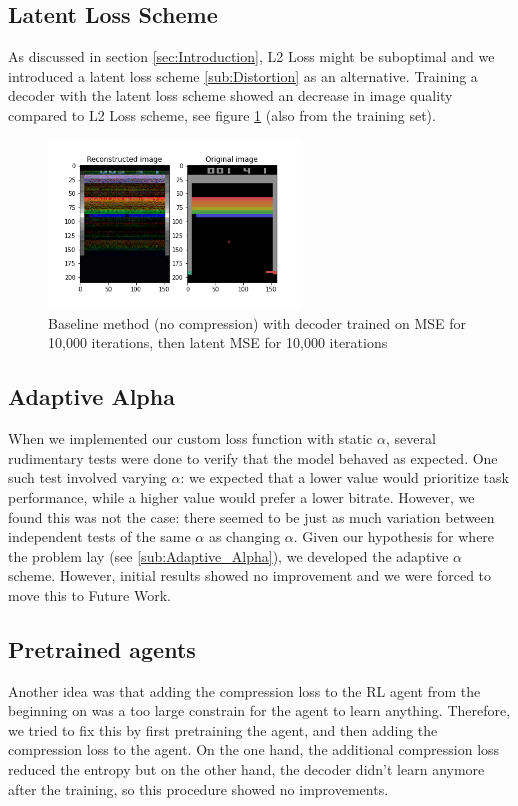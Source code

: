 \subsection{Latent Loss Scheme}
As discussed in section \ref{sec:Introduction}, L2 Loss might be suboptimal and
we introduced a latent loss scheme \ref{sub:Distortion} as an alternative.
Training a decoder with the latent loss scheme showed an decrease in image
quality compared to L2 Loss scheme, see figure \ref{fig:baseline_MSE_latent}
(also from the training set).

\begin{figure}[H]
    \centering
    \includegraphics[width=0.6\textwidth]{images/orig_reconstructed_rl3.0.png}
    \caption{Baseline method (no compression) with decoder trained on MSE for 10,000 iterations, then latent MSE for 10,000 iterations}
    \label{fig:baseline_MSE_latent}
\end{figure}

\subsection{Adaptive Alpha}
When we implemented our custom loss function with static $\alpha$, several
rudimentary tests were done to verify that the model behaved as expected. One
such test involved varying $\alpha$: we expected that a lower value would
prioritize task performance, while a higher value would prefer a lower bitrate.
However, we found this was not the case: there seemed to be just as much
variation between independent tests of the same $\alpha$ as changing $\alpha$.
Given our hypothesis for where the problem lay (see \ref{sub:Adaptive_Alpha}),
we developed the adaptive $\alpha$ scheme. However, initial results showed no
improvement and we were forced to move this to Future Work.

\subsection{Pretrained agents}
Another idea was that adding the compression loss to the RL agent from the
beginning on was a too large constrain for the agent to learn anything.
Therefore, we tried to fix this by first pretraining the agent, and then adding
the compression loss to the agent. On the one hand, the additional compression
loss reduced the entropy but on the other hand, the decoder didn't learn
anymore after the training, so this procedure showed no improvements.


